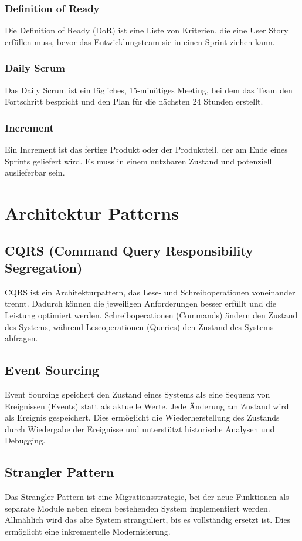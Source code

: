 \subsubsection{Definition of Ready}
Die Definition of Ready (DoR) ist eine Liste von Kriterien, die eine User Story erfüllen muss, bevor das Entwicklungsteam sie in einen Sprint ziehen kann.

\subsubsection{Daily Scrum}
Das Daily Scrum ist ein tägliches, 15-minütiges Meeting, bei dem das Team den Fortschritt bespricht und den Plan für die nächsten 24 Stunden erstellt.

\subsubsection{Increment}
Ein Increment ist das fertige Produkt oder der Produktteil, der am Ende eines Sprints geliefert wird. Es muss in einem nutzbaren Zustand und potenziell auslieferbar sein.

\section{Architektur Patterns}

\subsection{CQRS (Command Query Responsibility Segregation)}
CQRS ist ein Architekturpattern, das Lese- und Schreiboperationen voneinander trennt. Dadurch können die jeweiligen Anforderungen besser erfüllt und die Leistung optimiert werden. Schreiboperationen (Commands) ändern den Zustand des Systems, während Leseoperationen (Queries) den Zustand des Systems abfragen.

\subsection{Event Sourcing}
Event Sourcing speichert den Zustand eines Systems als eine Sequenz von Ereignissen (Events) statt als aktuelle Werte. Jede Änderung am Zustand wird als Ereignis gespeichert. Dies ermöglicht die Wiederherstellung des Zustands durch Wiedergabe der Ereignisse und unterstützt historische Analysen und Debugging.

\subsection{Strangler Pattern}
Das Strangler Pattern ist eine Migrationsstrategie, bei der neue Funktionen als separate Module neben einem bestehenden System implementiert werden. Allmählich wird das alte System stranguliert, bis es vollständig ersetzt ist. Dies ermöglicht eine inkrementelle Modernisierung.

